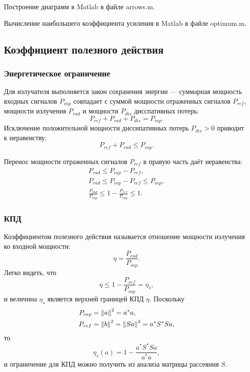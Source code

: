 Построение диаграмм в Matlab в файле arrows.m.

Вычисление наибольшего коэффициента усиления в Matlab в файле optimum.m.

\subsection{Коэффициент полезного действия}

\subsubsection{Энергетическое ограничение}

Для излучателя выполняется закон сохранения энергии --- суммарная мощность входных сигналов $P_{inp}$ совпадает с суммой мощности отраженных сигналов $P_{ref}$,
мощности излучения $P_{rad}$ и мощности $P_{dis}$ дисспативных потерь:
\[
    P_{ref} + P_{rad} + P_{dis} = P_{inp} .
\]
Исключение положительной мощности диссипативных потерь $P_{dis} >0$ приводит к неравенству:
\begin{equation}
    \label{emission:emitter:efficiency:power_inequality}
    P_{ref} + P_{rad} \le P_{inp} .
\end{equation}

Перенос мощности отраженных сигналов $P_{ref}$ в правую часть даёт неравенства:
\begin{gather*}
    P_{rad} \le P_{inp} - P_{ref}, \\
    P_{rad} \le P_{inp} - P_{ref} \le P_{inp}, \\
    \frac{P_{rad}}{P_{inp}} \le 1 - \frac{P_{ref}}{P_{inp}} \le 1 .
\end{gather*}

\subsubsection{КПД}
Коэффициентом полезного действия называется отношение мощности излучения ко входной мощности:
\[
    \eta
    = \frac{P_{rad}}{P_{inp}}.
\]
Легко видеть, что
\[
    \eta \le 1 - \frac{P_{ref}}{P_{inp}} = \eta_s ,
\]
и величина $\eta_s$ является верхней границей КПД $\eta$. Поскольку
\begin{align*}
    P_{inp} & = \left \| a \right \|^2 = a^* a , \\
    P_{ref} & = \left \| b \right \|^2 = \left \| S a \right \|^2 = a^* S^* S a \notag,
\end{align*}
то
\[
    \eta_s(a) = 1 - \frac{a^* S^* S a}{a^* a},
\]
и ограничение для КПД можно получить из анализа матрицы рассеяния $S$.


